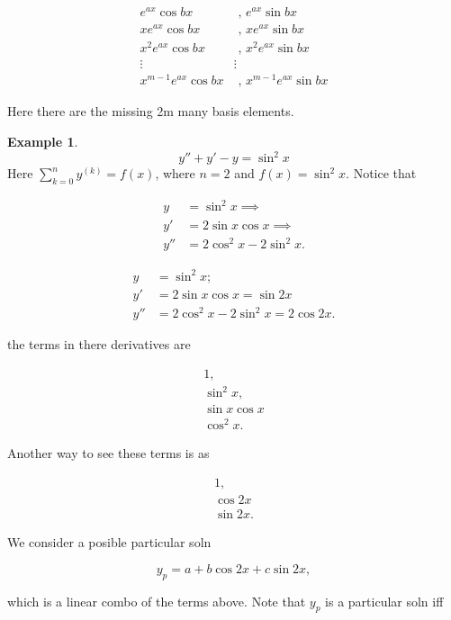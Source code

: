 \documentclass[12pt,a4paper]{article}
\theoremstyle{definition}
\newtheorem*{example}{Example}
\begin{document}
\begin{align*}
  e^{ax} \cos bx &\text{ , } e^{ax} \sin bx \\
  xe^{ax} \cos bx &\text{ , } xe^{ax} \sin bx \\
  x^2e^{ax} \cos bx &\text{ , } x^2e^{ax} \sin bx \\
  \vdots & \vdots  \\
  x^{m-1}e^{ax} \cos bx &\text{ , } x^{m-1}e^{ax} \sin bx
\end{align*}

Here there are the missing 2m many basis elements. 


\begin{example}
  \[ y'' + y' - y = \sin^2x \]
  Here \( \sum_{k=0}^{n} y^{(k)} = f(x) \), where \( n=2 \) and \( f(x) =
  \sin^2x\). Notice that 

  \begin{align*}
    y &= \sin^2x \implies \\
    y' &= 2 \sin x \cos x \implies \\
    y'' &= 2 \cos^2x - 2\sin^2x.
  \end{align*}

  \begin{align*}
    y &= \sin^2x; \\
    y' &= 2 \sin x \cos x = \sin 2x \\
    y'' &= 2 \cos^2x - 2\sin^2x = 2 \cos 2x.
  \end{align*}

  the terms in there derivatives are 

  \begin{align*}
    1, \\
    \sin^2x, \\
    \sin x \cos x \\
    \cos^2x. 
  \end{align*}

  Another way to see these terms is as 

  \begin{align*}
    1, \\
    \cos 2x \\
    \sin 2x. 
  \end{align*}

  We consider a posible particular soln 

  \[ y_p = a + b\cos 2x + c \sin 2x, \]

  which is a linear combo of the terms above. Note that \( y_p \) is a
  particular soln iff 


\end{example}
\end{document}
